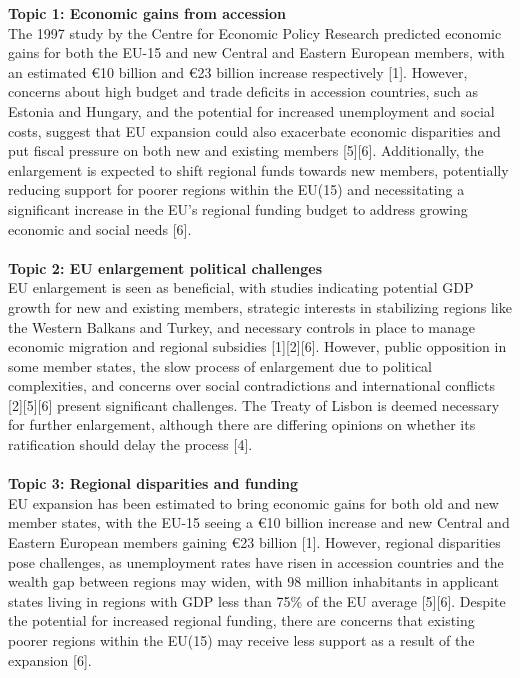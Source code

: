 \begin{summary}[title={\modelTopic Summary: Is EU expansion and EU membership itself a good idea? (DebateQFS)}, label=summary3]
\textbf{Topic 1: Economic gains from accession}\\
The 1997 study by the Centre for Economic Policy Research predicted economic gains for both the EU-15 and new Central and Eastern European members, with an estimated €10 billion and €23 billion increase respectively [1]. However, concerns about high budget and trade deficits in accession countries, such as Estonia and Hungary, and the potential for increased unemployment and social costs, suggest that EU expansion could also exacerbate economic disparities and put fiscal pressure on both new and existing members [5][6]. Additionally, the enlargement is expected to shift regional funds towards new members, potentially reducing support for poorer regions within the EU(15) and necessitating a significant increase in the EU's regional funding budget to address growing economic and social needs [6].\\
\\
\textbf{Topic 2: EU enlargement political challenges}\\
EU enlargement is seen as beneficial, with studies indicating potential GDP growth for new and existing members, strategic interests in stabilizing regions like the Western Balkans and Turkey, and necessary controls in place to manage economic migration and regional subsidies [1][2][6]. However, public opposition in some member states, the slow process of enlargement due to political complexities, and concerns over social contradictions and international conflicts [2][5][6] present significant challenges. The Treaty of Lisbon is deemed necessary for further enlargement, although there are differing opinions on whether its ratification should delay the process [4].\\
\\
\textbf{Topic 3: Regional disparities and funding}\\
EU expansion has been estimated to bring economic gains for both old and new member states, with the EU-15 seeing a €10 billion increase and new Central and Eastern European members gaining €23 billion [1]. However, regional disparities pose challenges, as unemployment rates have risen in accession countries and the wealth gap between regions may widen, with 98 million inhabitants in applicant states living in regions with GDP less than 75\% of the EU average [5][6]. Despite the potential for increased regional funding, there are concerns that existing poorer regions within the EU(15) may receive less support as a result of the expansion [6].
\end{summary}

